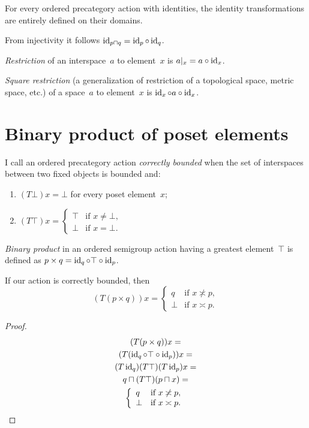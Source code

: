 \begin{obvious}
For every ordered precategory action with identities, the identity transformations are entirely defined on their domains.
\end{obvious}

From injectivity it follows $\operatorname{id}_{p\sqcap q} = \operatorname{id}_p\circ\operatorname{id}_q$.

\emph{Restriction} of an interspace~$a$ to element~$x$ is $a|_x=a\circ\operatorname{id}_x$.

\emph{Square restriction} (a generalization of restriction of a topological space, metric space, etc.) of a space~$a$ to element~$x$ is $\operatorname{id}_x\circ a\circ\operatorname{id}_x$.

\chapter{Binary product of poset elements}

\begin{defn}
I call an ordered precategory action \emph{correctly bounded} when the set of interspaces between two fixed objects is bounded and:
\begin{enumerate}
\item $(T\bot)x = \bot$ for every poset element~$x$;
\item $(T\top)x =
\left\{\begin{array}{ll}\top&\text{if }x\ne\bot,\\\bot&\text{if }x=\bot.\end{array}\right.$
\end{enumerate}
\end{defn}

\emph{Binary product} in an ordered semigroup action having a greatest element~$\top$ is defined as $p\times q=\operatorname{id}_q\circ\top\circ\operatorname{id}_p$.

\begin{thm}
If our action is correctly bounded, then
\[
(T(p\times q))x =
\left\{\begin{array}{ll}q&\text{if }x\nasymp p,\\\bot&\text{if }x\asymp p.\end{array}\right.
\]
\end{thm}

\begin{proof}
\begin{multline*}
(T(p\times q))x = \\
(T(\operatorname{id}_q\circ\top\circ\operatorname{id}_p))x = \\
(T\operatorname{id}_q)(T\top)(T\operatorname{id}_p)x = \\
q\sqcap(T\top)(p\sqcap x) = \\
\left\{\begin{array}{ll}q&\text{if }x\not\asymp p,\\\bot&\text{if }x\asymp p.\end{array}\right.
\end{multline*}
\end{proof}

